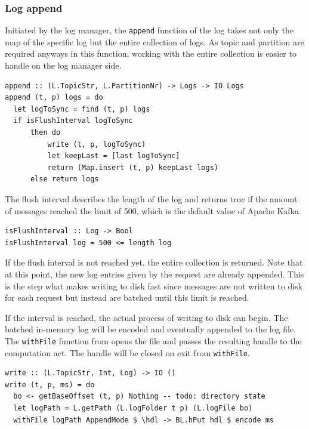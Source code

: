 \subsubsection{Log append}

Initiated by the log manager, the \lstinline{append} function of the log takes
not only the map of the specific log but the entire collection of logs. As topic
and partition are required anyways in this function, working with the entire
collection is easier to handle on the log manager side.

\begin{lstlisting}
append :: (L.TopicStr, L.PartitionNr) -> Logs -> IO Logs
append (t, p) logs = do
  let logToSync = find (t, p) logs
  if isFlushInterval logToSync
      then do
          write (t, p, logToSync)
          let keepLast = [last logToSync]
          return (Map.insert (t, p) keepLast logs)
      else return logs
\end{lstlisting}

The flush interval describes the length of the log and returns true if the
amount of messages reached the limit of 500, which is the default value of
Apache Kafka.

\begin{lstlisting}
isFlushInterval :: Log -> Bool
isFlushInterval log = 500 <= length log
\end{lstlisting}

If the flush interval is not reached yet, the entire collection is returned.
Note that at this point, the new log entries given by the request are already
appended. This is the step what makes writing to disk fast since messages are
not written to disk for each request but instead are batched until this limit is
reached.

If the interval is reached, the actual process of writing to disk can begin.
The batched in-memory log will be encoded and eventually appended to the log
file. The \lstinline{withFile} function from  opens
the file and passes the resulting handle to the computation act.  The handle
will be closed on exit from \lstinline{withFile}.

\begin{lstlisting}
write :: (L.TopicStr, Int, Log) -> IO ()
write (t, p, ms) = do
  bo <- getBaseOffset (t, p) Nothing -- todo: directory state
  let logPath = L.getPath (L.logFolder t p) (L.logFile bo)
  withFile logPath AppendMode $ \hdl -> BL.hPut hdl $ encode ms
\end{lstlisting}


